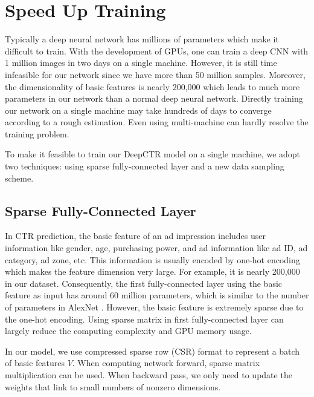 \documentclass{sig-alternate}
\begin{document}
\section{Speed Up Training}
Typically a deep neural network has millions of parameters which make it difficult to train. With the development of GPUs, one can train a deep CNN with 1 million images in two days on a single machine. However, it is still time infeasible for our network since we have more than 50 million samples. Moreover, the dimensionality of basic features is nearly 200,000 which leads to much more parameters in our network than a normal deep neural network. Directly training our network on a single machine may take hundreds of days to converge according to a rough estimation. Even using multi-machine can hardly resolve the training problem.

To make it feasible to train our DeepCTR model on a single machine, we adopt two techniques: using sparse fully-connected layer and a new data sampling scheme.
\subsection{Sparse Fully-Connected Layer}
In CTR prediction, the basic feature of an ad impression includes user information like gender, age, purchasing power, and ad information like ad ID, ad category, ad zone, etc. This information is usually encoded by one-hot encoding which makes the feature dimension very large. For example, it is nearly 200,000 in our dataset. Consequently, the first fully-connected layer using the basic feature as input has around 60 million parameters, which is similar to the number of  parameters in  AlexNet \cite{NIPS2012_4824}. However, the basic feature is extremely sparse due to the one-hot encoding. Using sparse matrix in first fully-connected layer can largely reduce the computing complexity and GPU memory usage.

In our model, we use compressed sparse row (CSR) format to represent a batch of basic features $V$. When computing network forward, sparse matrix multiplication can be used. When backward pass, we only need to update the weights that link to small numbers of nonzero dimensions.  
\end{document}
